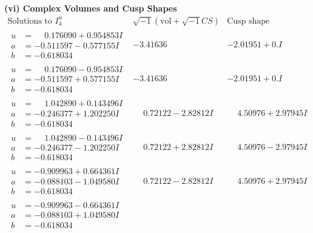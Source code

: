 \documentclass[1p]{elsarticle_modified}
\theoremstyle{definition}
\newcommand{\I}{\sqrt{-1}}
\begin{document}
\newpage\flushleft \textbf{(vi) Complex Volumes and Cusp Shapes}
$$\begin{array}{c|c|c}  
\text{Solutions to }I^u_{4}& \I (\text{vol} + \sqrt{-1}CS) & \text{Cusp shape}\\
 \hline 
\begin{aligned}
u &= \phantom{-}0.176090 + 0.954853 I \\
a &= -0.511597 - 0.577155 I \\
b &= -0.618034\phantom{ +0.000000I}\end{aligned}
 & -3.41636\phantom{ +0.000000I} & -2.01951 + 0. I\phantom{ +0.000000I} \\ \hline\begin{aligned}
u &= \phantom{-}0.176090 - 0.954853 I \\
a &= -0.511597 + 0.577155 I \\
b &= -0.618034\phantom{ +0.000000I}\end{aligned}
 & -3.41636\phantom{ +0.000000I} & -2.01951 + 0. I\phantom{ +0.000000I} \\ \hline\begin{aligned}
u &= \phantom{-}1.042890 + 0.143496 I \\
a &= -0.246377 + 1.202250 I \\
b &= -0.618034\phantom{ +0.000000I}\end{aligned}
 & \phantom{-}0.72122 - 2.82812 I & \phantom{-}4.50976 + 2.97945 I \\ \hline\begin{aligned}
u &= \phantom{-}1.042890 - 0.143496 I \\
a &= -0.246377 - 1.202250 I \\
b &= -0.618034\phantom{ +0.000000I}\end{aligned}
 & \phantom{-}0.72122 + 2.82812 I & \phantom{-}4.50976 - 2.97945 I \\ \hline\begin{aligned}
u &= -0.909963 + 0.664361 I \\
a &= -0.088103 - 1.049580 I \\
b &= -0.618034\phantom{ +0.000000I}\end{aligned}
 & \phantom{-}0.72122 - 2.82812 I & \phantom{-}4.50976 + 2.97945 I \\ \hline\begin{aligned}
u &= -0.909963 - 0.664361 I \\
a &= -0.088103 + 1.049580 I \\
b &= -0.618034\phantom{ +0.000000I}\end{aligned}

\end{array}$$
\end{document}
